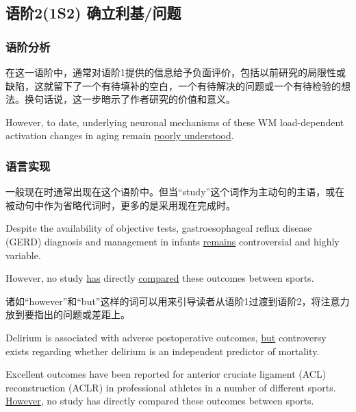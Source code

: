 \documentclass[a4paper]{ctexbook}
\begin{document}
  \subsection{语阶2(1S2) 确立利基/问题}

    \subsubsection{语阶分析}

    在这一语阶中，通常对语阶1提供的信息给予负面评价，包括以前研究的局限性或缺陷，这就留下了一个有待填补的空白，一个有待解决的问题或一个有待检验的想法。换句话说，这一步暗示了作者研究的价值和意义。

    \begin{eg}{}
      However, to date, underlying neuronal mechanisms of these WM load-dependent activation changes in aging remain \uline{poorly understood}.
    \end{eg}

    \subsubsection{语言实现}

    一般现在时通常出现在这个语阶中。但当“study”这个词作为主动句的主语，或在被动句中作为省略代词时，更多的是采用现在完成时。

    \begin{eg}{}
      Despite the availability of objective tests, gastroesophageal reflux disease (GERD) diagnosis and management in infants \uline{remains} controversial and highly variable.
    \end{eg}

    \begin{eg}{}
      However, no study \uline{has} directly \uline{compared} these outcomes between sports.
    \end{eg}

    诸如“however”和“but”这样的词可以用来引导读者从语阶1过渡到语阶2，将注意力放到要指出的问题或差距上。

    \begin{eg}{}
      Delirium is associated with adverse postoperative outcomes, \uline{but} controversy exists regarding whether delirium is an independent predictor of mortality.
    \end{eg}

    \begin{eg}{}
      Excellent outcomes have been reported for anterior cruciate ligament (ACL) reconstruction (ACLR) in professional athletes in a number of different sports. \uline{However}, no study has directly compared these outcomes between sports.
    \end{eg}
\end{document}
